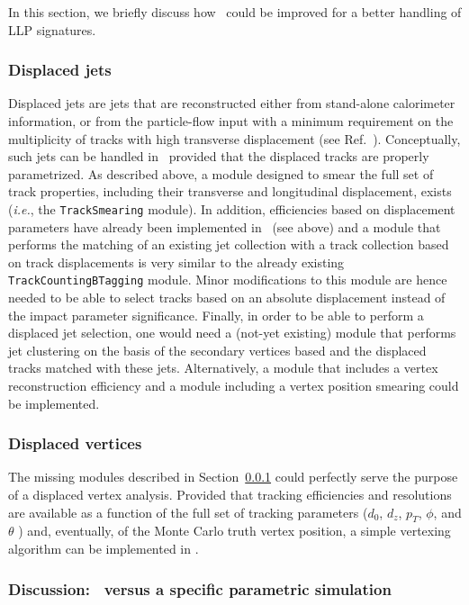 In this section, we briefly discuss how \DEL\ could be improved for a better
handling of LLP signatures.

\subsubsection{Displaced jets}
\label{sec:dispjets}

Displaced jets are jets that are reconstructed either from stand-alone calorimeter
information, or from the particle-flow input with a minimum requirement on the
multiplicity of tracks with high transverse displacement (see
Ref.~\cite{CMS:2014wda}). Conceptually, such jets can be handled in \DEL\
provided that the displaced tracks are properly parametrized. As described
above, a module designed to smear the full set of track properties, including
their transverse and longitudinal displacement, exists ({\it i.e.}, the
\verb+TrackSmearing+ module). In addition, efficiencies based on displacement
parameters have already been implemented in \MA\ (see above) and a module that
performs the matching of an existing jet collection with a track collection
based on track displacements is very similar to the already existing
\verb+TrackCountingBTagging+ module. Minor modifications to this module are
hence needed to be able to select tracks based on an absolute displacement
instead of the impact parameter significance. Finally, in order to be able to
perform a displaced jet selection, one would need a (not-yet existing) module
that performs jet clustering on the basis of the secondary vertices based and
the displaced tracks matched with these jets. Alternatively, a module that
includes a vertex reconstruction efficiency and a module including a vertex
position smearing could be implemented.


\subsubsection{Displaced vertices}

The missing modules described in Section~\ref{sec:dispjets} could perfectly
serve the purpose of a displaced vertex analysis. Provided that tracking
efficiencies and resolutions are available as a function of the full set of
tracking parameters ($d_0$, $d_z$, $p_T$, $\phi$, and $\theta$ ) and,
eventually, of the Monte Carlo truth vertex position, a simple vertexing
algorithm can be implemented in \DEL.

\subsubsection{Discussion: \DEL\ versus a specific parametric simulation}


